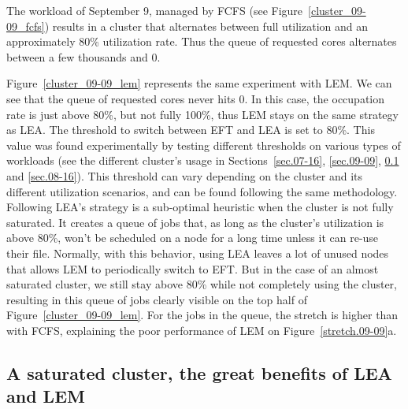 \documentclass[conference,10pt]{IEEEtran}
\begin{document}
The workload of September 9, managed by FCFS (see Figure~\ref{cluster_09-09_fcfs})
results in a cluster that alternates between full utilization and an approximately 80\% utilization rate.
Thus the queue of requested cores alternates between a few thousands and 0.

Figure~\ref{cluster_09-09_lem} represents the same experiment with LEM.
We can see that the queue of requested cores never hits 0.
In this case, the occupation rate is just above 80\%, but not fully
100\%, thus LEM stays on the same strategy as LEA.
The threshold to switch between EFT and LEA is set to 80\%. 
This value was found experimentally by testing different thresholds on various types of workloads (see the different cluster's usage in Sections~\ref{sec.07-16}, \ref{sec.09-09}, \ref{sec.03-26} and \ref{sec.08-16}).
This threshold can vary depending on the cluster and its different utilization scenarios, and can be found following the same methodology.
Following LEA's strategy is a sub-optimal heuristic when the cluster is not fully saturated.
It creates a queue of jobs that, as long as the cluster's utilization is above 80\%, won't
be scheduled on a node for a long time unless it can re-use their file.
Normally, with this behavior, using LEA leaves a lot of unused nodes that allows LEM
to periodically switch to EFT. But in the case of an almost 
saturated cluster, we still stay above 80\% while not completely using the cluster,
resulting in this queue of jobs clearly visible on the top half of Figure~\ref{cluster_09-09_lem}.
For the jobs in the queue, the stretch is higher than with FCFS, explaining the poor performance of
LEM on Figure~\ref{stretch.09-09}a.

\subsection{A saturated cluster, the great benefits of LEA and LEM}\label{sec.03-26}
\end{document}
